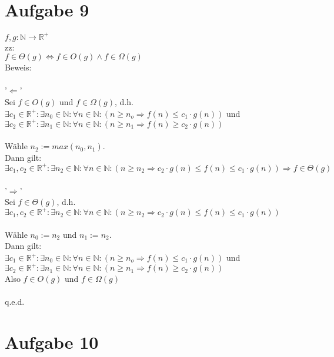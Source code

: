 \documentclass[12pt,ngerman]{article}
\theoremstyle{definition}
\begin{document}
\part*{Aufgabe 9}

$f,g: \mathbb{N} \to \mathbb{R}^+$\\
zz:\\
$f \in \Theta(g) \iff f \in O(g) \land f \in \Omega(g)$\\
Beweis:\\\\
'$\Leftarrow$'\\
Sei $f \in O(g)$ und $f \in \Omega(g)$, d.h.\\
$\exists c_1 \in \mathbb{R}^+ : \exists n_0 \in \mathbb{N} : \forall n \in \mathbb{N} : (n \geq n_o \Rightarrow f(n) \leq c_1 \cdot g(n))$ und\\
$\exists c_2 \in \mathbb{R}^+ : \exists n_1 \in \mathbb{N} : \forall n \in \mathbb{N} : (n \geq n_1 \Rightarrow f(n) \geq c_2 \cdot g(n))$\\\\
Wähle $n_2 := max(n_0, n_1)$.\\
Dann gilt:\\
$\exists c_1,c_2 \in \mathbb{R}^+ : \exists n_2 \in \mathbb{N} : \forall n \in \mathbb{N} : (n \geq n_2 \Rightarrow c_2 \cdot g(n) \leq f(n) \leq c_1 \cdot g(n))  \Rightarrow f \in \Theta(g)$\\\\
'$\Rightarrow$'\\
Sei $f \in \Theta(g)$, d.h.\\
$\exists c_1,c_2 \in \mathbb{R}^+ : \exists n_2 \in \mathbb{N} : \forall n \in \mathbb{N} : (n \geq n_2 \Rightarrow c_2 \cdot g(n) \leq f(n) \leq c_1 \cdot g(n))$\\\\
Wähle $n_0 := n_2$ und $n_1 := n_2$.\\
Dann gilt:\\
$\exists c_1 \in \mathbb{R}^+ : \exists n_0 \in \mathbb{N} : \forall n \in \mathbb{N} : (n \geq n_o \Rightarrow f(n) \leq c_1 \cdot g(n))$ und\\
$\exists c_2 \in \mathbb{R}^+ : \exists n_1 \in \mathbb{N} : \forall n \in \mathbb{N} : (n \geq n_1 \Rightarrow f(n) \geq c_2 \cdot g(n))$\\
Also $f \in O(g)$ und $f \in \Omega(g)$\\\\
q.e.d.

\part*{Aufgabe 10}
\end{document}
